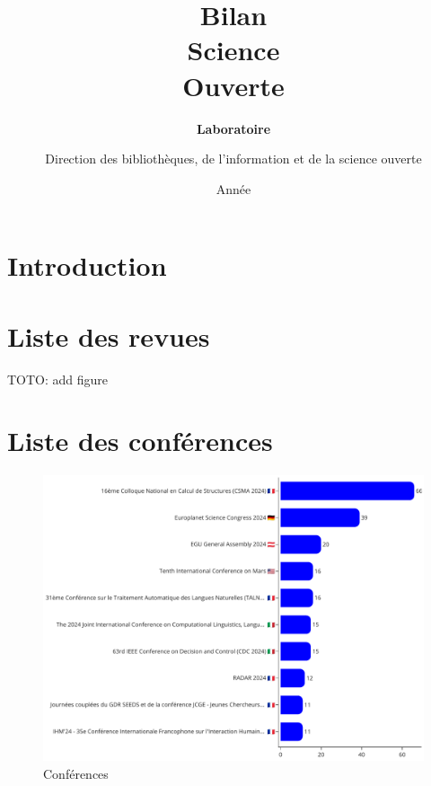 \documentclass[french, 11pt]{dibiso/biso}
\title{Bilan \\ Science \\ Ouverte}
\author{Direction des bibliothèques, de l’information et de la science ouverte}
\date{Année \reportyear}
\subtitle{\textbf{Laboratoire \labacronym} \\
  \medskip
  \labfullname
}
\begin{document}
\renewcommand{\arraystretch}{1.5}


\maketitle

\tableofcontents

\pagebreak



\section{Introduction}







\pagebreak

\section{Liste des revues}

TOTO: add figure
%  







\pagebreak

\section{Liste des conférences}

\begin{figure}[!h]
  \includegraphics[width=\textwidth]{figures/conferences.pdf}
  \centering
  \caption{Conférences}
  \label{fig_conferences}
\end{figure}
\end{document}
